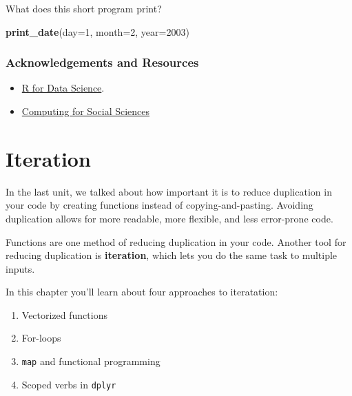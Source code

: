 \documentclass[]{book}
\newenvironment{Shaded}{\begin{snugshade}}{\end{snugshade}}
\newcommand{\KeywordTok}[1]{\textcolor[rgb]{0.13,0.29,0.53}{\textbf{#1}}}
\newcommand{\DataTypeTok}[1]{\textcolor[rgb]{0.13,0.29,0.53}{#1}}
\newcommand{\DecValTok}[1]{\textcolor[rgb]{0.00,0.00,0.81}{#1}}
\newcommand{\NormalTok}[1]{#1}
\providecommand{\tightlist}{%
  \setlength{\itemsep}{0pt}\setlength{\parskip}{0pt}}
\begin{document}
What does this short program print?

\begin{Shaded}
\begin{Highlighting}[]
\KeywordTok{print_date}\NormalTok{(}\DataTypeTok{day=}\DecValTok{1}\NormalTok{, }\DataTypeTok{month=}\DecValTok{2}\NormalTok{, }\DataTypeTok{year=}\DecValTok{2003}\NormalTok{)}
\end{Highlighting}
\end{Shaded}

\subsubsection*{Acknowledgements and
Resources}\label{acknowledgements-and-resources}

\begin{itemize}
\tightlist
\item
  \href{https://r4ds.had.co.nz/functions.html}{R for Data Science}.
\item
  \href{https://cfss.uchicago.edu/notes/functions}{Computing for Social
  Sciences}
\end{itemize}

\hypertarget{iteration}{\section{Iteration}\label{iteration}}

In the last unit, we talked about how important it is to reduce
duplication in your code by creating functions instead of
copying-and-pasting. Avoiding duplication allows for more readable, more
flexible, and less error-prone code.

Functions are one method of reducing duplication in your code. Another
tool for reducing duplication is \textbf{iteration}, which lets you do
the same task to multiple inputs.

In this chapter you'll learn about four approaches to iteratation:

\begin{enumerate}
\def\labelenumi{\arabic{enumi}.}
\tightlist
\item
  Vectorized functions
\item
  For-loops
\item
  \texttt{map} and functional programming
\item
  Scoped verbs in \texttt{dplyr}
\end{enumerate}
\end{document}
